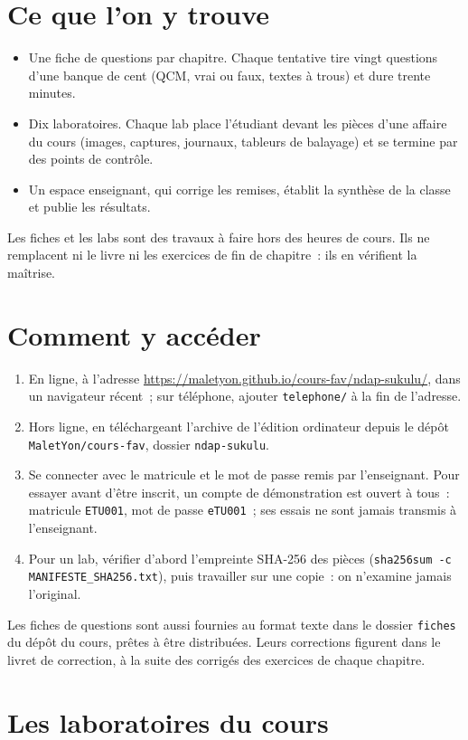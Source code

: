 \section*{Ce que l'on y trouve}

\begin{itemize}
    \item Une fiche de questions par chapitre. Chaque tentative tire vingt
          questions d'une banque de cent (QCM, vrai ou faux, textes à
          trous) et dure trente minutes.
    \item Dix laboratoires. Chaque lab place l'étudiant devant les pièces
          d'une affaire du cours (images, captures, journaux, tableurs de
          balayage) et se termine par des points de contrôle.
    \item Un espace enseignant, qui corrige les remises, établit la
          synthèse de la classe et publie les résultats.
\end{itemize}

Les fiches et les labs sont des travaux à faire hors des heures de cours.
Ils ne remplacent ni le livre ni les exercices de fin de chapitre~: ils en
vérifient la maîtrise.

\section*{Comment y accéder}

\begin{enumerate}
    \item En ligne, à l'adresse
          \url{https://maletyon.github.io/cours-fav/ndap-sukulu/}, dans un
          navigateur récent~; sur téléphone, ajouter \texttt{telephone/} à
          la fin de l'adresse.
    \item Hors ligne, en téléchargeant l'archive de l'édition ordinateur
          depuis le dépôt \texttt{MaletYon/cours-fav}, dossier
          \texttt{ndap-sukulu}.
    \item Se connecter avec le matricule et le mot de passe remis par
          l'enseignant. Pour essayer avant d'être inscrit, un compte de
          démonstration est ouvert à tous~: matricule \texttt{ETU001}, mot
          de passe \texttt{eTU001}~; ses essais ne sont jamais transmis à
          l'enseignant.
    \item Pour un lab, vérifier d'abord l'empreinte SHA-256 des pièces
          (\texttt{sha256sum -c MANIFESTE\_SHA256.txt}), puis travailler sur
          une copie~: on n'examine jamais l'original.
\end{enumerate}

\begin{boxinfo}
Les fiches de questions sont aussi fournies au format texte dans le dossier
\texttt{fiches} du dépôt du cours, prêtes à être distribuées. Leurs
corrections figurent dans le livret de correction, à la suite des corrigés
des exercices de chaque chapitre.
\end{boxinfo}

\section*{Les laboratoires du cours}


